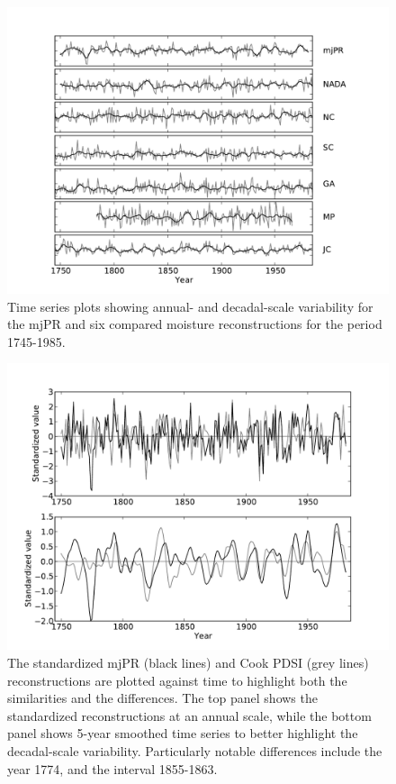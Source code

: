 \begin{figure}
\centering
\includegraphics[width=5in]{figures/reconsStackedZoom.pdf}
\caption{Time series plots showing annual- and decadal-scale variability for the mjPR and six compared moisture reconstructions for the period 1745-1985.}
\label{fig:allReconsZoom}
\end{figure}


\begin{figure}
\centering
\includegraphics[width=5in]{figures/reconCompare.pdf}
\caption{The standardized mjPR (black lines) and Cook PDSI (grey lines) reconstructions are plotted against time to highlight both the similarities and the differences. The top panel shows the standardized reconstructions at an annual scale, while the bottom panel shows 5-year smoothed time series to better highlight the decadal-scale variability. Particularly notable differences include the year 1774, and the interval 1855-1863.}
\label{fig:reconCompare}
\end{figure}

